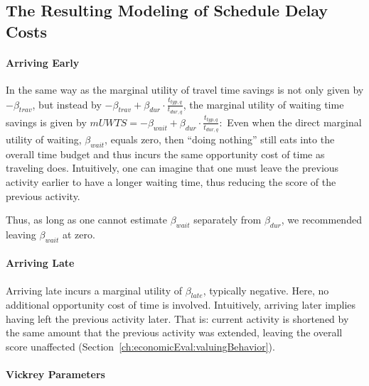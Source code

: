 
\subsection{The Resulting Modeling of Schedule Delay Costs}
\label{sec:schedule-delay-costs}

\paragraph{Arriving Early}

In the same way as the marginal utility of travel time savings is not only given by $- \beta_{trav}$, but instead by $- \beta_{trav} + \beta_{dur} \cdot \frac{t_{typ,q}}{t_{dur,q}}$, the marginal utility of waiting time savings is given by 
$
mUWTS = - \beta_{wait} + \beta_{dur} \cdot \frac{t_{typ,q}}{t_{dur,q}}: 
$
Even when the direct marginal utility of waiting, $\beta_{wait}$, equals zero, then ``doing nothing'' still eats into the overall time budget and thus incurs the same opportunity cost of time as traveling does.
%
Intuitively, one can imagine that one must leave the previous activity earlier to have a longer waiting time, thus reducing the score of the previous activity.

Thus, as long as one cannot estimate $\beta_{wait}$ separately from $\beta_{dur}$, we recommended leaving $\beta_{wait}$ at zero.

\paragraph{Arriving Late}

Arriving late incurs a marginal utility of $\beta_{late}$, typically negative.  Here, no additional opportunity cost of time is involved. Intuitively, arriving later implies having left the previous activity later.  That is: current activity is shortened by the same amount that the previous activity was extended, leaving the overall score unaffected (\cf Section~\ref{ch:economicEval:valuingBehavior}). 

\paragraph{Vickrey Parameters}

